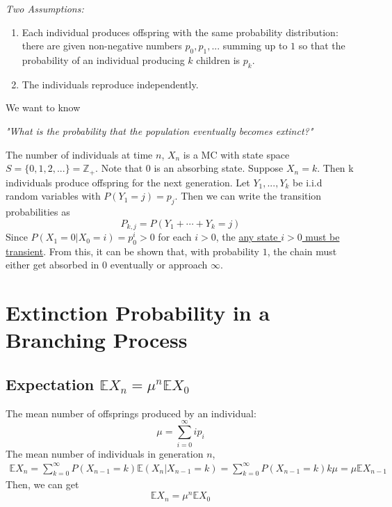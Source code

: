 \documentclass[11pt]{elegantbook}
\begin{document}
\textit{Two Assumptions:}
\begin{enumerate}[(1)]
    \item Each individual produces offspring with the same probability distribution: there are given non-negative numbers $p_0, p_1, ...$ summing up to $1$ so that the probability of an individual producing $k$ children is $p_k$.
    \item The individuals reproduce independently.
\end{enumerate}

We want to know
\begin{center}
    \textit{"What is the probability that the population eventually becomes extinct?"}
\end{center}

The number of individuals at time $n$, $X_n$ is a MC with state space $S = \{0,1,2,...\} = \mathbb{Z}_+$. Note that $0$ is an absorbing state. Suppose $X_n = k$. Then k individuals produce offspring for the next generation. Let $Y_1,...,Y_k$ be i.i.d random variables with $P(Y_1 = j) = p_j$. Then we can write the transition probabilities as $$P_{k,j}=P(Y_1+\cdots+Y_k=j)$$
Since $P(X_1=0|X_0=i)=p_0^i>0$ for each $i>0$, the \underline{any state $i>0$ must be transient}. From this, it can be shown that, with probability $1$, the chain must either get absorbed in $0$ eventually or approach $\infty$.

\section{Extinction Probability in a Branching Process}
\subsection{Expectation $\mathbb{E}X_n=\mu^n \mathbb{E}X_0$}
The mean number of offsprings produced by an individual: $$\mu=\sum_{i=0}^\infty i p_i$$
The mean number of individuals in generation $n$,
\begin{equation}
    \begin{aligned}
        \mathbb{E}X_n=\sum_{k=0}^\infty P(X_{n-1}=k)\mathbb{E}(X_n|X_{n-1}=k)=\sum_{k=0}^\infty P(X_{n-1}=k)k\mu=\mu \mathbb{E}X_{n-1}
    \end{aligned}
    \nonumber
\end{equation}
Then, we can get $$\mathbb{E}X_n=\mu^n \mathbb{E}X_0$$
\end{document}
